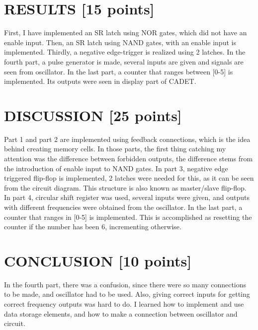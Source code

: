 \documentclass[pdftex,12pt,a4paper]{article}
\begin{document}
\section{RESULTS [15 points]}
First, I have implemented an SR latch using NOR gates, which did not have an enable input. Then, an SR latch using NAND gates, with an enable input is implemented. Thirdly, a negative edge-trigger is realized using 2 latches. In the fourth part, a pulse generator is made, several inputs are given and signals are seen from oscillator. In the last part, a counter that ranges between [0-5] is implemented. Its outputs were seen in display part of CADET.

\section{DISCUSSION [25 points]}
Part 1 and part 2 are implemented using feedback connections, which is the idea behind creating memory cells. In those parts, the first thing catching my attention was the difference between forbidden outputs, the difference stems from the introduction of enable input to NAND gates. In part 3, negative edge triggered flip-flop is implemented, 2 latches were needed for this, as it can be seen from the circuit diagram. This structure is also known as master/slave flip-flop. In part 4, circular shift register was used, several inputs were given, and outputs with different frequencies were obtained from the oscillator. In the last part, a counter that ranges in [0-5] is implemented. This is accomplished as resetting the counter if the number has been 6, incrementing otherwise.

\section{CONCLUSION [10 points]}
In the fourth part, there was a confusion, since there were so many connections to be made, and oscillator had to be used. Also, giving correct inputs for getting correct frequency outputs was hard to do. I learned how to implement and use data storage elements, and how to make a connection between oscillator and circuit.

\newpage
{}



\end{document}

